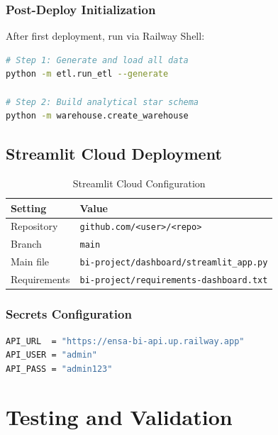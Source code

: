 \documentclass[12pt, a4paper]{report}
\begin{document}
\subsection{Post-Deploy Initialization}

After first deployment, run via Railway Shell:

\begin{lstlisting}[language=bash, caption={Post-Deploy Data Loading}]
# Step 1: Generate and load all data
python -m etl.run_etl --generate

# Step 2: Build analytical star schema
python -m warehouse.create_warehouse
\end{lstlisting}

\section{Streamlit Cloud Deployment}

\begin{table}[H]
\centering
\caption{Streamlit Cloud Configuration}
\label{tab:streamlit_config}
\begin{tabular}{@{}ll@{}}
\toprule
\textbf{Setting} & \textbf{Value} \\
\midrule
Repository       & \texttt{github.com/<user>/<repo>} \\
Branch           & \texttt{main} \\
Main file        & \texttt{bi-project/dashboard/streamlit\_app.py} \\
Requirements     & \texttt{bi-project/requirements-dashboard.txt} \\
\bottomrule
\end{tabular}
\end{table}

\subsection{Secrets Configuration}

\begin{lstlisting}[language=bash, caption={Streamlit Cloud Secrets (TOML format)}]
API_URL  = "https://ensa-bi-api.up.railway.app"
API_USER = "admin"
API_PASS = "admin123"
\end{lstlisting}

\chapter{Testing and Validation}
\end{document}

